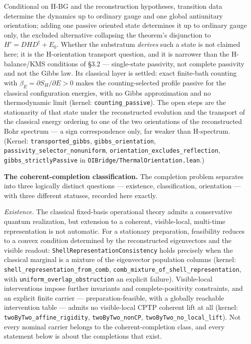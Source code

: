\documentclass[
]{article}
\begin{document}
Conditional on H-BG and the reconstruction hypotheses, transition data
determine the dynamics up to ordinary gauge and one global antiunitary
orientation; adding one passive oriented state determines it up to
ordinary gauge only, the excluded alternative collapsing the theorem's
disjunction to \(H' = DHD^\dagger + E_0\). Whether the substratum
\emph{derives} such a state is not claimed here; it is the H-orientation
transport question, and it is narrower than the H-balance/KMS conditions
of §3.2 --- single-state passivity, not complete passivity and not the
Gibbs law. Its classical layer is settled: exact finite-bath counting
with \(\beta_E = \partial S_H/\partial E > 0\) makes the
counting-selected profile passive for the classical configuration
energies, with no Gibbs approximation and no thermodynamic limit
(kernel: \texttt{counting\_passive}). The open steps are the
stationarity of that state under the reconstructed evolution and the
transport of the classical energy ordering to one of the two
orientations of the reconstructed Bohr spectrum --- a sign
correspondence only, far weaker than H-spectrum. (Kernel:
\texttt{transported\_gibbs}, \texttt{gibbs\_orientation},
\texttt{passivity\_selector\_nonuniform},
\texttt{orientation\_excludes\_reflection},
\texttt{gibbs\_strictlyPassive} in
\texttt{OIBridge/ThermalOrientation.lean}.)

\textbf{The coherent-completion classification.} The completion problem
separates into three logically distinct questions --- existence,
classification, orientation --- with three different statuses, recorded
here exactly.

\emph{Existence.} The classical fixed-basis operational theory admits a
conservative quantum realization, but extension to a coherent,
visible-local, multi-time representation is not automatic. For a
stationary preparation, feasibility reduces to a convex condition
determined by the reconstructed eigenvectors and the visible readout:
\texttt{ShellRepresentationConsistency} holds precisely when the
classical marginal is a mixture of the eigenvector population columns
(kernel: \texttt{shell\_representation\_from\_comb},
\texttt{comb\_mixture\_of\_shell\_representation}, with
\texttt{uniform\_overlap\_obstruction} an explicit failure).
Visible-local interventions impose further invariants and
complete-positivity constraints, and an explicit finite carrier ---
preparation-feasible, with a globally reachable intervention table ---
admits no visible-local CPTP coherent lift at all (kernel:
\texttt{twoByTwo\_affine\_rigidity}, \texttt{twoByTwo\_nonCP},
\texttt{twoByTwo\_no\_local\_lift}). Not every nominal carrier belongs
to the coherent-completion class, and every statement below is about the
completions that exist.
\end{document}
